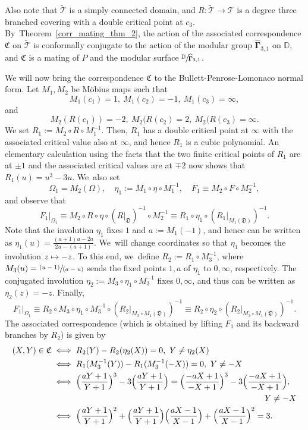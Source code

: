 \documentclass[JEP,XML,SOM,Unicode,NoFloatCountersInSection,published]{cedram}
\def\mto{\mathchoice{\longmapsto}{\mapsto}{\mapsto}{\mapsto}}
\newcommand{\pspfrac}[2]{\sfrac{(#1)}{(#2)}}
\let\faktor\sfrac
\theoremstyle{definition}
\theoremstyle{remark}
\newcommand{\D}{\mathbb{D}}
\newcommand{\cT}{\mathcal{T}}
\begin{document}
Also note that $\widetilde{\cT}$ is a simply connected domain, and $R:\widetilde{\cT}\to\cT$ is a degree three branched covering with a double critical point at $c_3$. By~Theorem~\ref{corr_mating_thm_2}, the action of the associated correspondence $\mathfrak{C}$ on $\widetilde{\cT}$ is conformally conjugate to the action of the modular group $\widehat{\pmb{\Gamma}}_{3,1}$ on $\D$, and $\mathfrak{C}$ is a mating of $P$ and the modular surface $\faktor{\D}{\widehat{\pmb{\Gamma}}_{3,1}}$.

We will now bring the correspondence $\mathfrak{C}$ to the Bullett-Penrose-Lomonaco normal form. Let $M_1, M_2$ be Möbius maps such that
\[
M_1(c_1)=1,\ M_1(c_2)=-1,\ M_1(c_3)=\infty,
\]
and
\[
M_2(R(c_1))= -2,\ M_2(R(c_2)=2,\ M_2(R(c_3)=\infty.
\]
We set $R_1:= M_2\circ R\circ M_1^{-1}$. Then, $R_1$ has a double critical point at $\infty$ with the associated critical value also at $\infty$, and hence $R_1$ is a cubic polynomial. An elementary calculation using the facts that the two finite critical points of $R_1$ are at $\pm 1$ and the associated critical values are at $\mp 2$ now shows that $R_1(u)=u^3-3u$. We~also set
\[
\Omega_1=M_2(\Omega),\quad \eta_1:=M_1\circ\eta\circ M_1^{-1},\quad F_1\equiv M_2\circ F\circ M_2^{-1},
\]
and observe that
\[
F_1\vert_{\Omega_1}\equiv M_2\circ R\circ\eta\circ\left(R\vert_{\mathfrak{D}}\right)^{-1}\circ M_2^{-1}\equiv R_1\circ \eta_1\circ(R_1\vert_{M_1(\mathfrak{D})})^{-1}.
\]
Note that the involution $\eta_1$ fixes $1$ and $a:=M_1(-1)$, and hence can be written as $\eta_1(u)=\frac{(a+1)u-2a}{2u-(a+1)}$. We~will change coordinates so that $\eta_1$ becomes the involution $z\mto -z$. To this end, we~define $R_2:=R_1\circ M_3^{-1}$, where $M_3(u)=\pspfrac{u-1}{a-u}$ sends the fixed points $1,a$ of $\eta_1$ to $0,\infty$, respectively. The conjugated involution $\eta_2:=M_3\circ\eta_1\circ M_3^{-1}$ fixes $0,\infty$, and thus can be written as $\eta_2(z)=-z$. Finally,
\[
F_1\vert_{\Omega_1}\equiv R_2\circ M_3\circ \eta_1\circ M_3^{-1} \circ (R_2\vert_{M_3\circ M_1(\mathfrak{D})})^{-1}\equiv R_2\circ\eta_2\circ (R_2\vert_{M_3\circ M_1(\mathfrak{D})})^{-1}.
\]
The associated correspondence (which is obtained by lifting $F_1$ and its backward branches by $R_2$) is given by
\begin{align*}
(X,Y)\in\mathfrak{C} & \iff R_2(Y)-R_2(\eta_2(X))=0,\ Y\neq\eta_2(X)\\
& \iff R_1(M_3^{-1}(Y))-R_1(M_3^{-1}(-X))=0,\ Y\neq -X\\
& \iff \Bigl(\frac{aY+1}{Y+1}\Bigr)^3-3\Bigl(\frac{aY+1}{Y+1}\Bigr)=\Bigl(\frac{-aX+1}{-X+1}\Bigr)^3-3\Bigl(\frac{-aX+1}{-X+1}\Bigr),\\
& \hspace{9cm} Y\neq-X\\
& \iff \Bigl(\frac{aY+1}{Y+1}\Bigr)^2+ \Bigl(\frac{aY+1}{Y+1}\Bigr) \Bigl(\frac{aX-1}{X-1}\Bigr)+ \Bigl(\frac{aX-1}{X-1}\Bigr)^2=3.
\end{align*}
\end{document}
